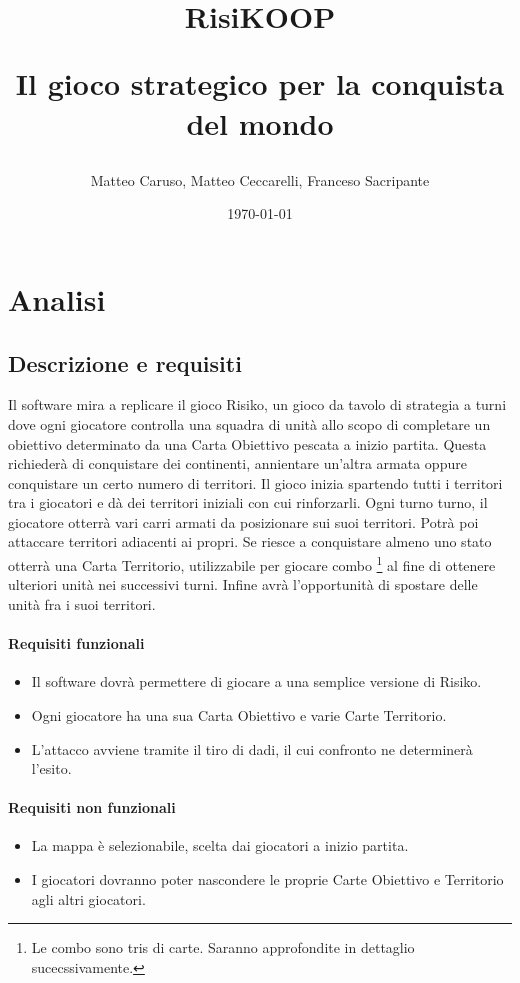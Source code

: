 \documentclass[a4paper,12pt]{report}
\title{
RisiKOOP \\
\begin{large}
Il gioco strategico per la conquista del mondo
\end{large}
}
\author{Matteo Caruso, Matteo Ceccarelli, Franceso Sacripante}
\date{\today}
\begin{document}
\maketitle

\tableofcontents

\chapter{Analisi}

\section{Descrizione e requisiti}

Il software mira a replicare il gioco Risiko, un gioco da tavolo di strategia a turni dove ogni giocatore controlla una squadra di unità allo scopo di completare un obiettivo determinato da una Carta Obiettivo pescata a inizio partita.
Questa richiederà di conquistare dei continenti, annientare un'altra armata oppure conquistare un certo numero di territori.
Il gioco inizia spartendo tutti i territori tra i giocatori e dà dei territori iniziali con cui rinforzarli.
Ogni turno turno, il giocatore otterrà vari carri armati da posizionare sui suoi territori.
Potrà poi attaccare territori adiacenti ai propri.
Se riesce a conquistare almeno uno stato otterrà una Carta Territorio, utilizzabile per giocare combo
\footnote{Le combo sono tris di carte. Saranno approfondite in dettaglio sucecssivamente.} al fine di ottenere ulteriori unità nei successivi turni.
Infine avrà l'opportunità di spostare delle unità fra i suoi territori.

\subsubsection{Requisiti funzionali}
\begin{itemize}
	\item Il software dovrà permettere di giocare a una semplice versione di Risiko.
	\item Ogni giocatore ha una sua Carta Obiettivo e varie Carte Territorio.
	\item L'attacco avviene tramite il tiro di dadi, il cui confronto ne determinerà l'esito.
\end{itemize}

\subsubsection{Requisiti non funzionali}
\begin{itemize}
	\item La mappa è selezionabile, scelta dai giocatori a inizio partita.
	\item I giocatori dovranno poter nascondere le proprie Carte Obiettivo e Territorio agli altri giocatori.
\end{itemize}
\end{document}
